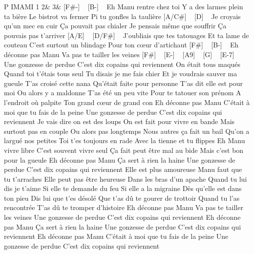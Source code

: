 P IMAMI
1 2\& 3\&
[F#-] ~ [B-] ~
Eh Manu rentre chez toi
Y a des larmes plein ta bière
Le bistrot va fermer
Pi tu gonfles la taulière
[A/C#] ~ [D] ~
Je croyais qu'un mec en cuir
Ça pouvait pas chialer
Je pensais même que souffrir
Ça pouvais pas t'arriver
[A/E] ~ [D/F#] ~
J'oubliais que tes tatouages
Et ta lame de couteau
C'est surtout un blindage
Pour ton cœur d'artichaut
[F#] ~ [B-] ~
Eh déconne pas Manu
Va pas te tailler les veines
[F#] ~ [E-] ~ [A9] ~ [G] ~ [E-7] ~
Une gonzesse de perdue
C'est dix copains qui reviennent
On était tous maqués
Quand toi t'étais tous seul
Tu disais je me fais chier
Et je voudrais sauver ma gueule
T'as croisé cette nana
Qu'était faite pour personne
T'as dit elle est pour moi
Ou alors y a maldonne
T'as été un peu vite
Pour te tatouer son prénom
A l'endroit où palpite
Ton grand cœur de grand con
Eh déconne pas Manu
C'était à moi que tu fais de la peine
Une gonzesse de perdue
C'est dix copains qui reviennent
Je vais dire on est des loups
On est fait pour vivre en bande
Mais surtout pas en couple
Ou alors pas longtemps
Nous autres ça fait un bail
Qu'on a largué nos petites
Toi t'es toujours en rade
Avec la tienne et tu flippes
Eh Manu vivre libre
C'est souvent vivre seul
Ça fait peut être mal au bide
Mais c'est bon pour la gueule
Eh déconne pas Manu
Ça sert à rien la haine
Une gonzesse de perdue
C'est dix copains qui reviennent
Elle est plus amoureuse
Manu faut que tu t'arraches
Elle peut pas être heureuse
Dans les bras d'un apache
Quand tu lui dis je t'aime
Si elle te demande du feu
Si elle a la migraine
Dès qu'elle est dans ton pieu
Dis lui que t'es désolé
Que t'as dû te gourer de trottoir
Quand tu l'as rencontrée
T'as dû te tromper d'histoire
Eh déconne pas Manu
Va pas te tailler les veines
Une gonzesse de perdue
C'est dix copains qui reviennent
Eh déconne pas Manu
Ça sert à rien la haine
Une gonzesse de perdue
C'est dix copains qui reviennent
Eh déconne pas Manu
C'était à moi que tu fais de la peine
Une gonzesse de perdue
C'est dix copains qui reviennent